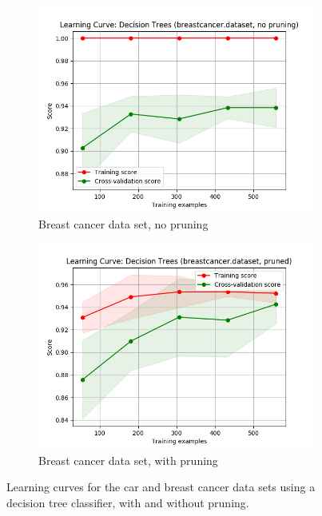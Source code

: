 \documentclass{article}
\begin{document}
\begin{figure}[htb]
    \medskip

    \begin{subfigure}{0.5\textwidth}
      \includegraphics[width=\linewidth]{out/decision_tree_pruning/breastcancer-noprune-learning.png}
      \caption{Breast cancer data set, no pruning}
      \label{fig:dt-learning-3}
    \end{subfigure}\hfil
    \begin{subfigure}{0.5\textwidth}
      \includegraphics[width=\linewidth]{out/decision_tree_pruning/breastcancer-prune-learning.png}
      \caption{Breast cancer data set, with pruning}
      \label{fig:dt-learning-4}
    \end{subfigure}

    \caption{Learning curves for the car and breast cancer data sets using a decision tree classifier, with and without pruning.}
    \label{fig:dt-learning}
    \end{figure}
\end{document}
